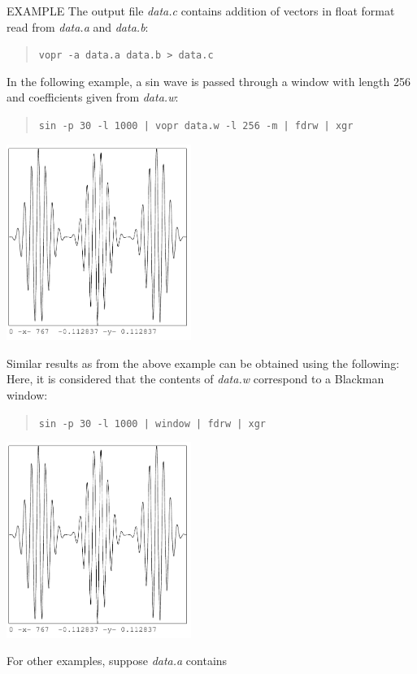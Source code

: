 \begin{qsection}{EXAMPLE}
The output file {\em data.c} contains addition of
vectors in float format read from {\em data.a} and {\em data.b}:
\begin{quote}
  \verb!vopr -a data.a data.b > data.c !
\end{quote}
\par
In the following example, a sin wave is passed through
a window with length 256 and coefficients given from
{\em data.w}:
\begin{quote}
  \verb!sin -p 30 -l 1000 | vopr data.w -l 256 -m | fdrw | xgr!
\end{quote}
\begin{center}
\includegraphics[width=6cm]{fig/vopr_1.pdf}
\end{center}
Similar results as from the above example can be obtained using the following:
 Here, it is considered that the contents of {\em data.w} correspond to a Blackman window:
\begin{quote}
  \verb!sin -p 30 -l 1000 | window | fdrw | xgr!
\end{quote}
\begin{center}
\includegraphics[width=6cm]{fig/vopr_2.pdf}
\end{center}
For other examples, suppose {\em data.a} contains
\begin{displaymath}

\end{displaymath}
\end{qsection}
